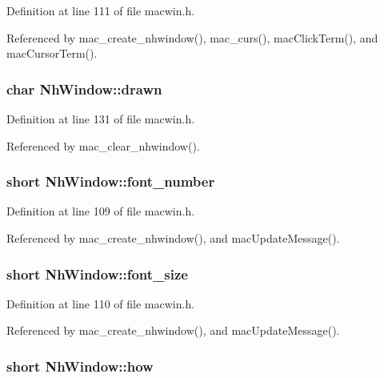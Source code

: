 Definition at line 111 of file macwin.\+h.



Referenced by mac\+\_\+create\+\_\+nhwindow(), mac\+\_\+curs(), mac\+Click\+Term(), and mac\+Cursor\+Term().

\hypertarget{structNhWindow_a8d324543f7ad278513ccdb303ebec2d6}{
\subsubsection[{drawn}]{\setlength{\rightskip}{0pt plus 5cm}char Nh\+Window\+::drawn}}\label{structNhWindow_a8d324543f7ad278513ccdb303ebec2d6}


Definition at line 131 of file macwin.\+h.



Referenced by mac\+\_\+clear\+\_\+nhwindow().

\hypertarget{structNhWindow_a69b70dabcb069d8584b5bdf7acb31a61}{
\subsubsection[{font\+\_\+number}]{\setlength{\rightskip}{0pt plus 5cm}short Nh\+Window\+::font\+\_\+number}}\label{structNhWindow_a69b70dabcb069d8584b5bdf7acb31a61}


Definition at line 109 of file macwin.\+h.



Referenced by mac\+\_\+create\+\_\+nhwindow(), and mac\+Update\+Message().

\hypertarget{structNhWindow_a2748f3b69f3d3e42fdaf8171cbbdb367}{
\subsubsection[{font\+\_\+size}]{\setlength{\rightskip}{0pt plus 5cm}short Nh\+Window\+::font\+\_\+size}}\label{structNhWindow_a2748f3b69f3d3e42fdaf8171cbbdb367}


Definition at line 110 of file macwin.\+h.



Referenced by mac\+\_\+create\+\_\+nhwindow(), and mac\+Update\+Message().

\hypertarget{structNhWindow_ac6a901247ddc4de0deff8f4d67b716ae}{
\subsubsection[{how}]{\setlength{\rightskip}{0pt plus 5cm}short Nh\+Window\+::how}}\label{structNhWindow_ac6a901247ddc4de0deff8f4d67b716ae}


